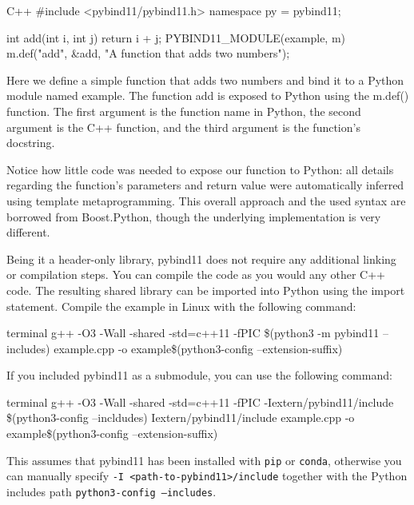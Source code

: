 \begin{neonlisting}[language=C++]{C++}
#include <pybind11/pybind11.h>
namespace py = pybind11;

int add(int i, int j) {
    return i + j;
}
PYBIND11_MODULE(example, m) {
    m.def("add", &add, "A function that adds two numbers");
}
\end{neonlisting}

Here we define a simple function that adds two numbers and bind it to a Python module named example. The function add is exposed to Python using the m.def() function. The first argument is the function name in Python, the second argument is the C++ function, and the third argument is the function's docstring.

\begin{observationblock}[pybind11]
    Notice how little code was needed to expose our function to Python: all details regarding the
    function's parameters and return value were automatically inferred using template
    metaprogramming. This overall approach and the used syntax are borrowed from Boost.Python,
    though the underlying implementation is very different.
\end{observationblock}

Being it a header-only library, pybind11 does not require any additional linking or compilation steps. You can compile the code as you would any other C++ code. The resulting shared library can be imported into Python using the import statement.
Compile the example in Linux with the following command:

\begin{neonlisting}[language = bash]{terminal}
g++ -O3 -Wall -shared -std=c++11 -fPIC 
\$(python3 -m pybind11 --includes)
example.cpp -o example\$(python3-config --extension-suffix)
\end{neonlisting}

If you included pybind11 as a submodule, you can use the following command: 

\begin{neonlisting}[language = bash]{terminal}
g++ -O3 -Wall -shared -std=c++11 -fPIC 
-Iextern/pybind11/include 
\$(python3-config --incldudes) Iextern/pybind11/include
example.cpp -o example\$(python3-config --extension-suffix)
\end{neonlisting}

This assumes that pybind11 has been installed with \texttt{pip} or \texttt{conda}, otherwise you can manually specify
\texttt{-I <path-to-pybind11>/include} together with the Python includes path \texttt{python3-config --includes}.

